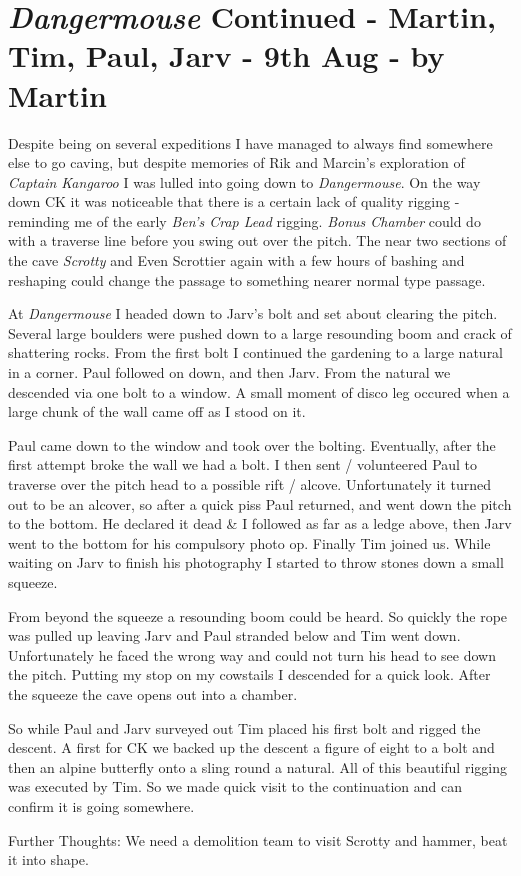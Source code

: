 \section{\texorpdfstring{\emph{Dangermouse} Continued - Martin, Tim,
Paul, Jarv - 9th Aug - by
Martin}{Dangermouse Continued - Martin, Tim, Paul, Jarv - 9th Aug - by Martin}}

Despite being on several expeditions I have managed to always find
somewhere else to go caving, but despite memories of Rik and Marcin's
exploration of \emph{Captain Kangaroo} I was lulled into going down to
\emph{Dangermouse}. On the way down CK it was noticeable that there is a
certain lack of quality rigging - reminding me of the early \emph{Ben's
Crap Lead}
rigging. \emph{Bonus Chamber} could do with a traverse line before you
swing out over the pitch. The near two sections of the cave
\emph{Scrotty} and Even Scrottier again with a few hours of bashing and
reshaping could change the passage to something nearer normal type
passage.

At \emph{Dangermouse} I headed down to Jarv's bolt and set about
clearing the pitch. Several large boulders were pushed down to a large
resounding boom and crack of shattering rocks. From the first bolt I
continued the gardening to a large natural in a corner. Paul followed on
down, and then Jarv. From the natural we descended via one bolt to a
window. A small moment of disco leg occured when a large chunk of the
wall came off as I stood on it.

Paul came down to the window and took over the bolting. Eventually,
after the first attempt broke the wall we had a bolt. I then sent /
volunteered Paul to traverse over the pitch head to a possible rift /
alcove. Unfortunately it turned out to be an alcover, so after a quick
piss Paul returned, and went down the pitch to the bottom. He declared
it dead \& I followed as far as a ledge above, then Jarv went to the
bottom for his compulsory photo op. Finally Tim joined us. While waiting
on Jarv to finish his photography I started to throw stones down a small
squeeze.

From beyond the squeeze a resounding boom could be heard. So quickly the
rope was pulled up leaving Jarv and Paul stranded below and Tim went
down. Unfortunately he faced the wrong way and could not turn his head
to see down the pitch. Putting my stop on my cowstails I descended for a
quick look. After the squeeze the cave opens out into a chamber.

So while Paul and Jarv surveyed out Tim placed his first bolt and rigged
the descent. A first for CK we backed up the descent a figure of eight
to a bolt and then an alpine butterfly onto a sling round a natural. All
of this beautiful rigging was executed by Tim. So we made quick visit to
the continuation and can confirm it is going somewhere.

Further Thoughts: We need a demolition team to visit Scrotty and hammer,
beat it into shape.

